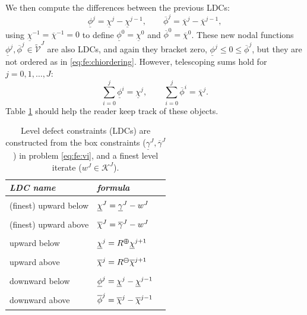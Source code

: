 \documentclass[letterpaper,final,12pt,reqno]{amsart}
\theoremstyle{cstyle}
\theoremstyle{cstyle*}
\theoremstyle{dstyle}
\numberwithin{equation}{section}
\numberwithin{figure}{section}
\numberwithin{table}{section}
\numberwithin{theorem}{section}
\newcommand{\cK}{\mathcal{K}}
\newcommand{\maxR}{R^{\bm{\oplus}}}
\newcommand{\minR}{R^{\bm{\ominus}}}
\begin{document}
We then compute the differences between the previous LDCs:
\begin{equation}
\underline{\phi}^j = \underline{\chi}^j - \underline{\chi}^{j-1}, \qquad \overline{\phi}^j = \overline{\chi}^j - \overline{\chi}^{j-1},  \label{eq:fe:philevels}
\end{equation}
using $\underline{\chi}^{-1}=\overline{\chi}^{-1}=0$ to define $\underline{\phi}^0=\underline{\chi}^0$ and $\overline{\phi}^0=\overline{\chi}^0$.  These new nodal functions $\underline{\phi}^{j},\overline{\phi}^{j} \in \tilde{\mathcal{V}}^J$ are also LDCs, and again they bracket zero, $\underline{\phi}^j \le 0 \le \overline{\phi}^j$, but they are not ordered as in \eqref{eq:fe:chiordering}.  However, telescoping sums hold for $j=0,1,\dots,J$:
\begin{equation}
\sum_{i=0}^j \underline{\phi}^i = \underline{\chi}^j, \qquad \sum_{i=0}^j \overline{\phi}^i = \overline{\chi}^j.  \label{eq:fe:telescoping}
\end{equation}
Table \ref{tab:ldcs} should help the reader keep track of these objects.

\begin{table}[H]
\begin{tabular}{llc}
\emph{LDC name}        & \emph{formula} \\ \hline
(finest) upward below & ${\Large \strut} \underline{\chi}^J = \underline{\gamma}^J - w^J$ \\
(finest) upward above & ${\Large \strut} \overline{\chi}^J = \overline{\gamma}^J - w^J$ \\
upward below          & ${\Large \strut} \underline{\chi}^{j} = \maxR \underline{\chi}^{j+1}$ \\
upward above          & ${\Large \strut} \overline{\chi}^{j} = \minR \overline{\chi}^{j+1}$ \\
downward below        & ${\Large \strut} \underline{\phi}^j = \underline{\chi}^j - \underline{\chi}^{j-1}$ \\
downward above        & ${\Large \strut} \overline{\phi}^j = \overline{\chi}^j - \overline{\chi}^{j-1}$ \\
\end{tabular}

\medskip
\caption{Level defect constraints (LDCs) are constructed from the box constraints ($\underline{\gamma}^J,\overline{\gamma}^J$) in problem \eqref{eq:fe:vi}, and a finest level iterate ($w^J \in \cK^J$).}
\label{tab:ldcs}
\end{table}
\end{document}
